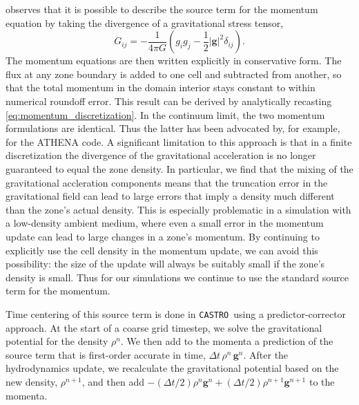 \documentclass[iop,numberedappendix]{../emulateapj}
\newcommand{\castro}{\texttt{CASTRO}}
\begin{document}
\citet[Chapter 4]{shu:1992} observes that it is possible to describe the source term 
for the momentum equation by taking the divergence of a gravitational stress tensor,
\begin{equation}
  G_{ij} = -\frac{1}{4\pi G}\left(g_i g_j - \frac{1}{2}|\mathbf{g}|^2\delta_{ij}\right).
\end{equation}
The momentum equations are then written explicitly in conservative form.
The flux at any zone boundary is added to one cell and
subtracted from another, so that the total momentum in the domain interior stays constant to
within numerical roundoff error. This result can be derived by analytically recasting 
\autoref{eq:momentum_discretization}. In the continuum limit, the two momentum
formulations are identical. Thus the latter has been advocated by, for example, 
\cite{jiang:2013} for the ATHENA code. A significant limitation to this approach is that in a finite discretization 
the divergence of the gravitational acceleration is no longer guaranteed to equal
the zone density. In particular, we find that the mixing of the gravitational accleration components
means that the truncation error in the gravitational field can lead to large errors
that imply a density much different than the zone's actual density. This is especially
problematic in a simulation with a low-density ambient medium, where even a small error 
in the momentum update can lead to large changes in a zone's momentum. By continuing to explicitly
use the cell density in the momentum update, we can avoid this possibility: the size of the update
will always be suitably small if the zone's density is small. Thus for our simulations
we continue to use the standard source term for the momentum.

Time centering of this source term is done in \castro\ using a predictor-corrector approach.
At the start of a coarse grid timestep, we solve the gravitational potential for the density $\rho^n$.
We then add to the momenta a prediction of the source term that is first-order accurate in time, 
$\Delta t\, \rho^n\, \mathbf{g}^n$. After the hydrodynamics update, we recalculate
the gravitational potential based on the new density, $\rho^{n+1}$, and then add 
$-(\Delta t/2) \rho^n \mathbf{g}^n + (\Delta t/2) \rho^{n+1} \mathbf{g}^{n+1}$ to the momenta.
\end{document}
